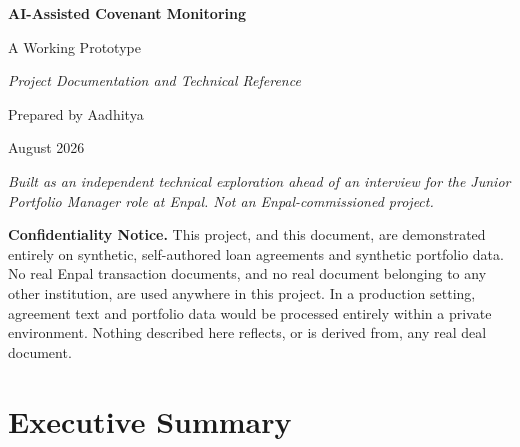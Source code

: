 \documentclass[11pt,a4paper]{article}
\begin{document}
\begin{titlepage}
\centering
\vspace*{2.5cm}

{\Huge\bfseries AI-Assisted Covenant Monitoring}

\vspace{0.6cm}
{\Large A Working Prototype}

\vspace{0.4cm}
{\large\itshape Project Documentation and Technical Reference}

\vspace{2.5cm}

{\large Prepared by Aadhitya}

\vspace{0.3cm}
{\large August 2026}

\vspace{2.5cm}

\begin{minipage}{0.8\textwidth}
\centering
\small\itshape
Built as an independent technical exploration ahead of an interview for the Junior Portfolio Manager role at Enpal. Not an Enpal-commissioned project.
\end{minipage}

\vfill

\end{titlepage}

\begin{noticebox}
\textbf{Confidentiality Notice.} This project, and this document, are demonstrated entirely on synthetic, self-authored loan agreements and synthetic portfolio data. No real Enpal transaction documents, and no real document belonging to any other institution, are used anywhere in this project. In a production setting, agreement text and portfolio data would be processed entirely within a private environment. Nothing described here reflects, or is derived from, any real deal document.
\end{noticebox}

\vspace{1cm}

\section*{Executive Summary}
\end{document}
